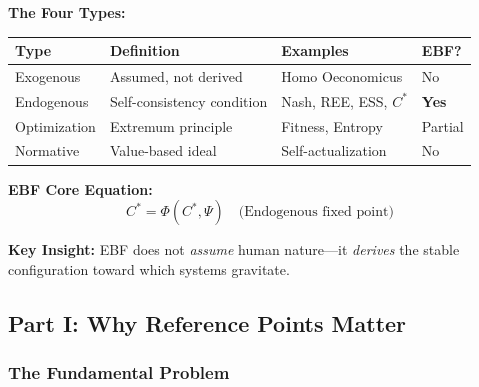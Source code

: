 
\begin{tcolorbox}[colback=yellow!10!white, colframe=yellow!75!black,
    title=\textbf{Quick Reference: Types of Reference Points}]

\textbf{The Four Types:}
\begin{center}
\small
\begin{tabular}{@{}llll@{}}
\toprule
\textbf{Type} & \textbf{Definition} & \textbf{Examples} & \textbf{EBF?} \\
\midrule
Exogenous & Assumed, not derived & Homo Oeconomicus & No \\
Endogenous & Self-consistency condition & Nash, REE, ESS, $C^*$ & \cellcolor{green!20}\textbf{Yes} \\
Optimization & Extremum principle & Fitness, Entropy & Partial \\
Normative & Value-based ideal & Self-actualization & No \\
\bottomrule
\end{tabular}
\end{center}

\textbf{EBF Core Equation:}
\begin{equation}
\boxed{C^* = \Phi(C^*, \Psi)} \quad \text{(Endogenous fixed point)}
\end{equation}

\textbf{Key Insight:}
EBF does not \emph{assume} human nature---it \emph{derives} the stable
configuration toward which systems gravitate.

\end{tcolorbox}




\subsection{Part I: Why Reference Points Matter}
\label{sec:AY-motivation}

\subsubsection{The Fundamental Problem}

